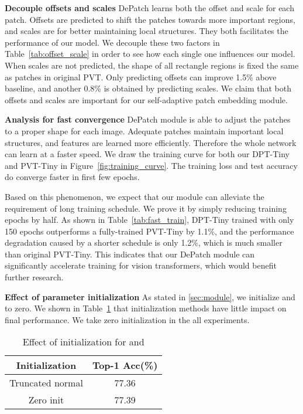 \documentclass[sigconf,screen]{acmart}
\begin{document}
\textbf{Decouple offsets and scales}
DePatch learns both the offset and scale for each patch. Offsets are predicted to shift the patches towards more important regions, and scales are for better maintaining local structures. They both facilitates the performance of our model. We decouple these two factors in Table~\ref{tab:offset_scale} in order to see how each single one influences our model. When scales are not predicted, the shape of all rectangle regions is fixed the same as patches in original PVT. Only predicting offsets can improve 1.5\% above baseline, and another 0.8\% is obtained by predicting scales. We claim that both offsets and scales are important for our self-adaptive patch embedding module.

\textbf{Analysis for fast convergence}
DePatch module is able to adjust the patches to a proper shape for each image. Adequate patches maintain important local structures, and features are learned more efficiently. Therefore the whole network can learn at a faster speed. We draw the training curve for both our DPT-Tiny and PVT-Tiny in Figure~\ref{fig:training_curve}. The training loss and test accuracy do converge faster in first few epochs.

Based on this phenomenon, we expect that our module can alleviate the requirement of long training schedule. We prove it by simply reducing training epochs by half. As shown in Table~\ref{tab:fast_train}, DPT-Tiny trained with only 150 epochs outperforms a fully-trained PVT-Tiny by 1.1\%, and the performance degradation caused by a shorter schedule is only 1.2\%, which is much smaller than original PVT-Tiny. This indicates that our DePatch module can significantly accelerate training for vision transformers, which would benefit further research.

\textbf{Effect of parameter initialization}
As stated in \ref{sec:module}, we initialize  and  to zero. We shown in Table~\ref{tab:result_init} that initialization methods have little impact on final performance. We take zero initialization in the all experiments.
\begin{table}
  \caption{Effect of initialization for  and }
  \label{tab:result_init}
  \begin{tabular}{cc}
    \toprule
    Initialization & Top-1 Acc(\%)\\
    \midrule
    Truncated normal & 77.36\\
    Zero init        & 77.39\\
  \bottomrule
\end{tabular}
\end{table}
\end{document}
